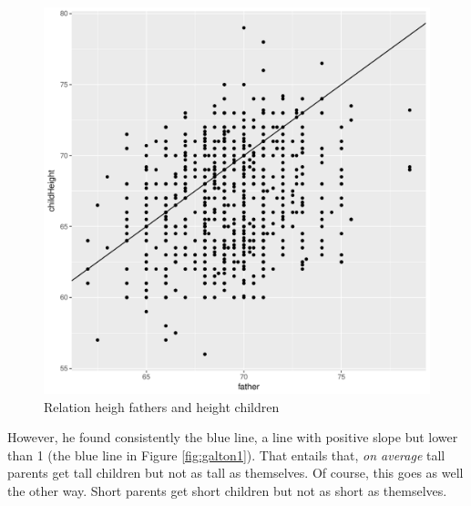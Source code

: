 \documentclass[
]{book}
\begin{document}
\begin{figure}

{\centering \includegraphics[width=600px]{./figures/Galton2} 

}

\caption{Relation heigh fathers and height children}\label{fig:galton2}
\end{figure}

However, he found consistently the blue line, a line with positive slope but lower than 1 (the blue line in Figure \ref{fig:galton1}). That entails that, \emph{on average} tall parents get tall children but not as tall as themselves. Of course, this goes as well the other way. Short parents get short children but not as short as themselves.
\end{document}
